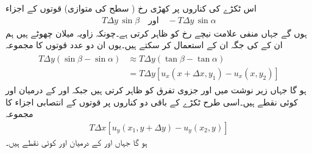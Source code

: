 اس ٹکڑے کی کناروں پر کھڑی رخ ( سطح کی متوازی) قوتوں کے اجزاء 
\begin{align*}
T\Delta y\,\sin \beta\quad \text{اور}\quad -T\Delta y\,\sin \alpha
\end{align*} 
ہوں گے جہاں منفی علامت نیچے رخ کو ظاہر کرتی ہے۔چونکہ زاویہ میلان چھوٹے ہیں ہم ان کے  کی جگہ ان کے   استعمال کر سکتے ہیں۔یوں ان دو عدد قوتوں کا مجموعہ
\begin{gather}
\begin{aligned}\label{مساوات_جزوی_قوت_کنارہ_الف}
T\Delta y(\sin \beta-\sin \alpha)& \approx T\Delta y(\tan \beta-\tan \alpha)\\
&=T\Delta y[u_x(x+\Delta x,y_1)-u_x(x,y_2)]
\end{aligned}
\end{gather}
ہو گا جہاں زیر نوشت میں  اور  جزوی تفرق کو ظاہر کرتی ہیں جبکہ  اور  کے درمیان   اور   کوئی نقطے ہیں۔اسی طرح ٹکڑے کے باقی دو کناروں پر قوتوں کے انتصابی اجزاء کا مجموعہ  
\begin{align}\label{مساوات_جزوی_قوت_کنارہ_ب}
T\Delta x[u_y(x_1,y+\Delta y)-u_y(x_2,y)]
\end{align}
ہو گا جہاں  اور  کے درمیان  اور  کوئی نقطے ہیں۔

